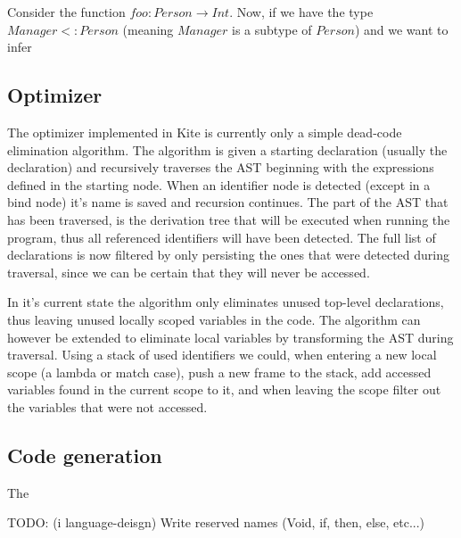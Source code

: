 Consider the function $foo : Person \to Int$. Now, if we have the type $Manager <: Person$ (meaning $Manager$ is a subtype of $Person$) and we want to infer %



\subsection{Optimizer}

The optimizer implemented in Kite is currently only a simple dead-code elimination algorithm. The algorithm is given a starting declaration (usually the  declaration) and recursively traverses the AST beginning with the expressions defined in the starting node. When an identifier node is detected (except in a bind node) it's name is saved and recursion continues. The part of the AST that has been traversed, is the derivation tree that will be executed when running the program, thus all referenced identifiers will have been detected. The full list of declarations is now filtered by only persisting the ones that were detected during traversal, since we can be certain that they will never be accessed.

In it's current state the algorithm only eliminates unused top-level declarations, thus leaving unused locally scoped variables in the code. The algorithm can however be extended to eliminate local variables by transforming the AST during traversal. Using a stack of used identifiers we could, when entering a new local scope (a lambda or match case), push a new frame to the stack, add accessed variables found in the current scope to it, and when leaving the scope filter out the variables that were not accessed.

\subsection{Code generation}

The

TODO: (i language-deisgn) Write reserved names (Void, if, then, else, etc...)



